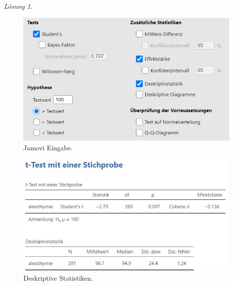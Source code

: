 \documentclass[
]{book}
\theoremstyle{definition}
\theoremstyle{definition}
\theoremstyle{definition}
\theoremstyle{definition}
\theoremstyle{remark}
\newtheorem*{solution}{Lösung}
\begin{document}
\begin{solution}
\leavevmode

\begin{figure}
\includegraphics[width=1\linewidth]{figures/05-exr-alexithymie-jmv-input} \caption{Jamovi Eingabe.}\label{fig:sol-alexithymie-input}
\end{figure}

\begin{figure}
\includegraphics[width=1\linewidth]{figures/05-exr-alexithymie-jmv-output} \caption{Deskriptive Statistiken.}\label{fig:sol-alexithymie-output}
\end{figure}

\end{solution}
\end{document}

